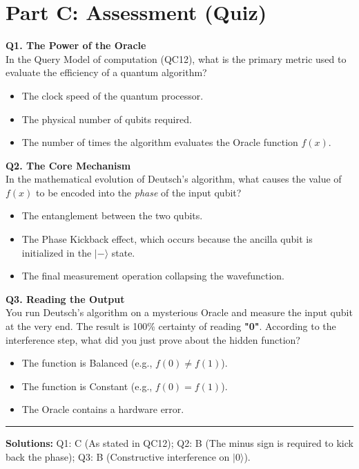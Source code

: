 \documentclass[a4paper,11pt]{article}
\begin{document}
\newpage

\section{Part C: Assessment (Quiz)}

\textbf{Q1. The Power of the Oracle}\\
In the Query Model of computation (QC12), what is the primary metric used to evaluate the efficiency of a quantum algorithm?
\begin{itemize}
    \item[A)] The clock speed of the quantum processor.
    \item[B)] The physical number of qubits required.
    \item[C)] The number of times the algorithm evaluates the Oracle function $f(x)$.
\end{itemize}

\vspace{0.3cm}

\textbf{Q2. The Core Mechanism}\\
In the mathematical evolution of Deutsch's algorithm, what causes the value of $f(x)$ to be encoded into the \textit{phase} of the input qubit?
\begin{itemize}
    \item[A)] The entanglement between the two qubits.
    \item[B)] The Phase Kickback effect, which occurs because the ancilla qubit is initialized in the $|-\rangle$ state.
    \item[C)] The final measurement operation collapsing the wavefunction.
\end{itemize}

\vspace{0.3cm}

\textbf{Q3. Reading the Output}\\
You run Deutsch's algorithm on a mysterious Oracle and measure the input qubit at the very end. The result is 100\% certainty of reading \textbf{"0"}. According to the interference step, what did you just prove about the hidden function?
\begin{itemize}
    \item[A)] The function is Balanced (e.g., $f(0) \neq f(1)$).
    \item[B)] The function is Constant (e.g., $f(0) = f(1)$).
    \item[C)] The Oracle contains a hardware error.
\end{itemize}

\vspace{1cm}
\hrule
\vspace{0.2cm}
\footnotesize{\textbf{Solutions:} Q1: C (As stated in QC12); Q2: B (The minus sign is required to kick back the phase); Q3: B (Constructive interference on $|0\rangle$).}
\end{document}
